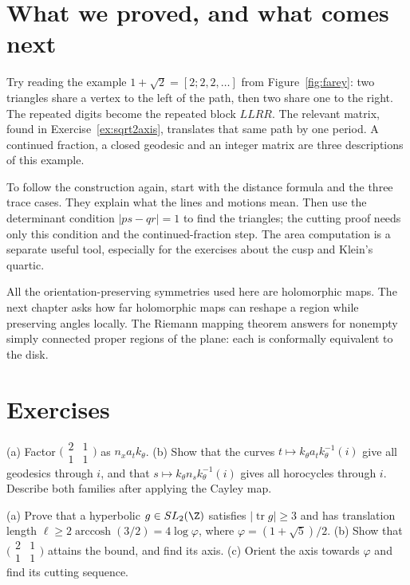 \section{What we proved, and what comes next}

Try reading the example $1+\sqrt2=[2;2,2,\ldots]$ from Figure~\ref{fig:farey}: two triangles share a vertex to the left of the path, then two share one to the right. The repeated digits become the repeated block $LLRR$. The relevant matrix, found in Exercise~\ref{ex:sqrt2axis}, translates that same path by one period. A continued fraction, a closed geodesic and an integer matrix are three descriptions of this example.

To follow the construction again, start with the distance formula and the three trace cases. They explain what the lines and motions mean. Then use the determinant condition $|ps-qr|=1$ to find the triangles; the cutting proof needs only this condition and the continued-fraction step. The area computation is a separate useful tool, especially for the exercises about the cusp and Klein's quartic.

All the orientation-preserving symmetries used here are holomorphic maps. The next chapter asks how far holomorphic maps can reshape a region while preserving angles locally. The Riemann mapping theorem answers for nonempty simply connected proper regions of the plane: each is conformally equivalent to the disk.

\section{Exercises}

\begin{exercise}[$\star$]\label{ex:iwasawaexplicit}
(a) Factor $\bigl(\begin{smallmatrix}2&1\\1&1\end{smallmatrix}\bigr)$ as $n_xa_tk_\theta$. (b) Show that the curves $t\mapsto k_\theta a_tk_\theta^{-1}(i)$ give all geodesics through $i$, and that $s\mapsto k_\theta n_sk_\theta^{-1}(i)$ gives all horocycles through $i$. Describe both families after applying the Cayley map.
\end{exercise}

\begin{exercise}[$\star\star$]\label{ex:shortest}
(a) Prove that a hyperbolic $g\in SL_2(\Z)$ satisfies $|\operatorname{tr}g|\ge3$ and has translation length
$\ell\ge2\operatorname{arccosh}(3/2)=4\log\varphi$, where $\varphi=(1+\sqrt5)/2$.
(b) Show that $\bigl(\begin{smallmatrix}2&1\\1&1\end{smallmatrix}\bigr)$ attains the bound, and find its axis.
(c) Orient the axis towards $\varphi$ and find its cutting sequence.
\end{exercise}

